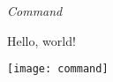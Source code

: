 \documentclass{article}
\begin{document}
\emph{Command}

Hello, world!

\texttt{[image: command]}
\end{document}
